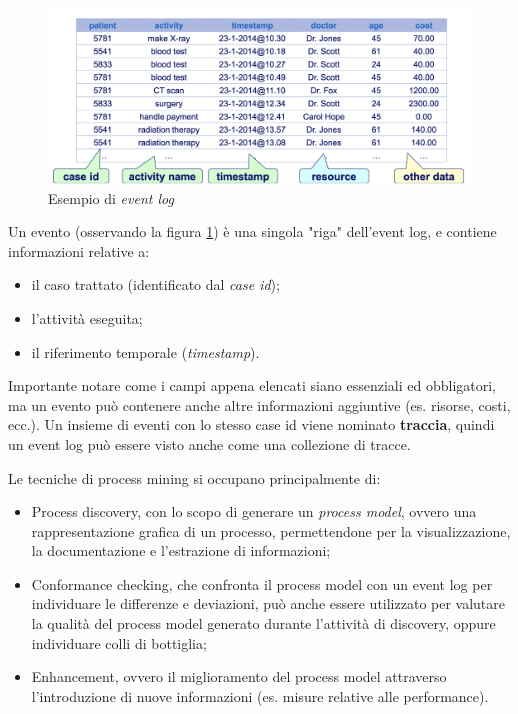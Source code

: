 \begin{figure}[!h] 
    \centering 
    \includegraphics[width=0.9\columnwidth]{immagini/event_log_ex.png} 
    \caption{Esempio di \textit{event log} \cite{site:event-log-img}}
    \label{fig:event-log-img}
\end{figure}


Un evento (osservando la figura \ref{fig:event-log-img}) è una singola "riga" dell'event log, e contiene informazioni relative a:
\begin{itemize}
\item il caso trattato (identificato dal \textit{case id});
\item l'attività eseguita;
\item il riferimento temporale (\textit{timestamp}).
\end{itemize}
Importante notare come i campi appena elencati siano essenziali ed obbligatori, ma un evento può contenere anche altre informazioni aggiuntive (es. risorse, costi, ecc.).
Un insieme di eventi con lo stesso case id viene nominato \textbf{traccia}, quindi un event log può essere visto anche come una collezione di tracce.

Le tecniche di process mining si occupano principalmente di:
\begin{itemize}
\item Process discovery, con lo scopo di generare un \textit{process model}, ovvero una rappresentazione grafica di un processo, permettendone per la visualizzazione, la documentazione e l'estrazione di informazioni;

\item Conformance checking, che confronta il process model con un event log per individuare le differenze e deviazioni, può anche essere utilizzato per valutare la qualità del process model generato durante l'attività di discovery, oppure individuare colli di bottiglia;

\item Enhancement, ovvero il miglioramento del process model attraverso l'introduzione di nuove informazioni (es. misure relative alle performance).
\end{itemize}









